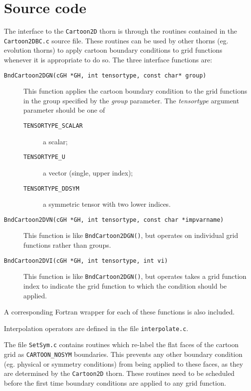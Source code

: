 \documentclass{article}
\begin{document}
\section{Source code}

The interface to the \texttt{Cartoon2D} thorn is through the routines
contained in the \texttt{Cartoon2DBC.c} source file. These routines
can be used by other thorns (eg. evolution thorns) to apply cartoon
boundary conditions to grid functions whenever it is appropriate to do
so. The three interface functions are:

\begin{description}

  \item[\texttt{BndCartoon2DGN(cGH *GH, int tensortype, const char*
      group)}]
    This function applies the cartoon boundary condition to the grid
    functions in the group specified by the \emph{group} parameter.
    The \emph{tensortype} argument parameter should be one of
    \begin{description}
      \item[\texttt{TENSORTYPE\_SCALAR}] a scalar;
      \item[\texttt{TENSORTYPE\_U}] a vector (single, upper index);
      \item[\texttt{TENSORTYPE\_DDSYM}] a symmetric tensor with two
	lower indices.
    \end{description}

  \item[\texttt{BndCartoon2DVN(cGH *GH, int tensortype, const char
      *impvarname)}]
    This function is like \texttt{BndCartoon2DGN()}, but operates on
    individual grid functions rather than groups.

  \item[\texttt{BndCartoon2DVI(cGH *GH, int tensortype, int vi)}]
    This function is like \texttt{BndCartoon2DGN()}, but operates
    takes a grid function index to indicate the grid function to which
    the condition should be applied.

\end{description}

A corresponding Fortran wrapper for each of these functions is also
included.

Interpolation operators are defined in the file
\texttt{interpolate.c}.

The file \texttt{SetSym.c} contains routines which re-label the flat
faces of the cartoon grid as \texttt{CARTOON\_NOSYM} boundaries. This
prevents any other boundary condition (eg. physical or symmetry
conditions) from being applied to these faces, as they are determined
by the \texttt{Cartoon2D} thorn. These routines need to be scheduled
before the first time boundary conditions are applied to any grid
function.
\end{document}
